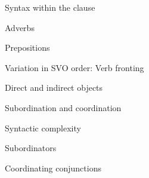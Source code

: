 \setcounter{listWWNumixleveli}{6}
\begin{listWWNumixleveli}
\item 
\setcounter{listWWNumixlevelii}{0}
\begin{listWWNumixlevelii}
\item 
\begin{styleListParagraph}
Syntax within the clause 
\end{styleListParagraph}


\setcounter{listWWNumixleveliii}{0}
\begin{listWWNumixleveliii}
\item 
\begin{styleListParagraph}
Adverbs
\end{styleListParagraph}

\item 
\begin{styleListParagraph}
Prepositions 
\end{styleListParagraph}

\item 
\begin{styleListParagraph}
Variation in SVO order: Verb fronting 
\end{styleListParagraph}

\item 
\begin{styleListParagraph}
Direct and indirect objects 
\end{styleListParagraph}

\end{listWWNumixleveliii}
\item 
\begin{styleListParagraph}
Subordination and coordination 
\end{styleListParagraph}


\setcounter{listWWNumixleveliii}{0}
\begin{listWWNumixleveliii}
\item 
\begin{styleListParagraph}
Syntactic complexity
\end{styleListParagraph}

\item 
\begin{styleListParagraph}
Subordinators
\end{styleListParagraph}

\item 
\begin{styleListParagraph}
Coordinating conjunctions 
\end{styleListParagraph}


\end{listWWNumixleveliii}
\end{listWWNumixlevelii}
\end{listWWNumixleveli}
